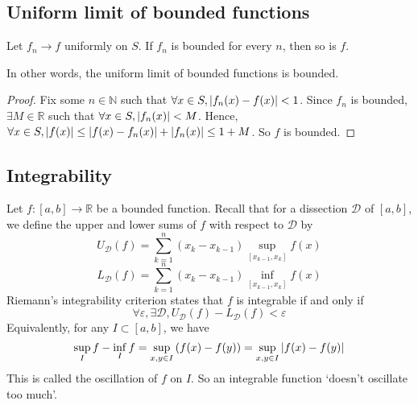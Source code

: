 \subsection{Uniform limit of bounded functions}
\begin{lemma}
	Let \( f_n \to f \) uniformly on \( S \).
	If \( f_n \) is bounded for every \( n \), then so is \( f \).
\end{lemma}
\noindent In other words, the uniform limit of bounded functions is bounded.
\begin{proof}
	Fix some \( n \in \mathbb N \) such that \( \forall x \in S, \abs{f_n(x) - f(x)} < 1 \).
	Since \( f_n \) is bounded, \( \exists M \in \mathbb R \) such that \( \forall x \in S, \abs{f_n(x)} < M \).
	Hence, \( \forall x \in S, \abs{f(x)} \leq \abs{f(x) - f_n(x)} + \abs{f_n(x)} \leq 1 + M \).
	So \( f \) is bounded.
\end{proof}

\subsection{Integrability}
Let \( f \colon [a, b] \to \mathbb R \) be a bounded function.
Recall that for a dissection \( \mathcal D \) of \( [a, b] \), we define the upper and lower sums of \( f \) with respect to \( \mathcal D \) by
\[
	U_{\mathcal D}(f) = \sum_{k=1}^n (x_k - x_{k-1}) \sup_{[x_{k-1}, x_k]} f(x)
\]
\[
	L_{\mathcal D}(f) = \sum_{k=1}^n (x_k - x_{k-1}) \inf_{[x_{k-1}, x_k]} f(x)
\]
Riemann's integrability criterion states that \( f \) is integrable if and only if
\[
	\forall \varepsilon, \exists \mathcal D, U_{\mathcal D}(f) - L_{\mathcal D}(f) < \varepsilon
\]
Equivalently, %
for any \( I \subset [a, b] \), we have
\[
	\sup_I f - \inf_I f = \sup_{x,y \in I} \qty(f(x) - f(y)) = \sup_{x,y \in I} \abs{f(x) - f(y)}
\]
This is called the oscillation of \( f \) on \( I \).
So an integrable function `doesn't oscillate too much'.

